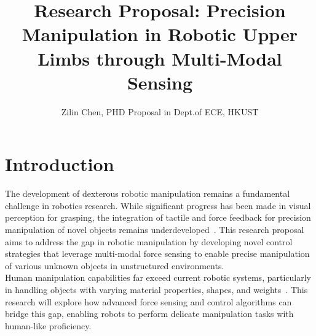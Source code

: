 \documentclass[11pt,a4paper]{article}
\title{Research Proposal: Precision Manipulation in Robotic Upper Limbs through Multi-Modal Sensing}
\author{Zilin Chen, PHD Proposal in Dept.\;of ECE, HKUST}
\date{}
\begin{document}
\maketitle

\section{Introduction}
The development of dexterous robotic manipulation remains a fundamental challenge in robotics research. While significant progress has been made in visual perception for grasping, the integration of tactile and force feedback for precision manipulation of novel objects remains underdeveloped~\cite{billard2019trends}. This research proposal aims to address the gap in robotic manipulation by developing novel control strategies that leverage multi-modal force sensing to enable precise manipulation of various unknown objects in unstructured environments.\\
Human manipulation capabilities far exceed current robotic systems, particularly in handling objects with varying material properties, shapes, and weights~\cite{chen2023bi}. This research will explore how advanced force sensing and control algorithms can bridge this gap, enabling robots to perform delicate manipulation tasks with human-like proficiency.
\end{document}
